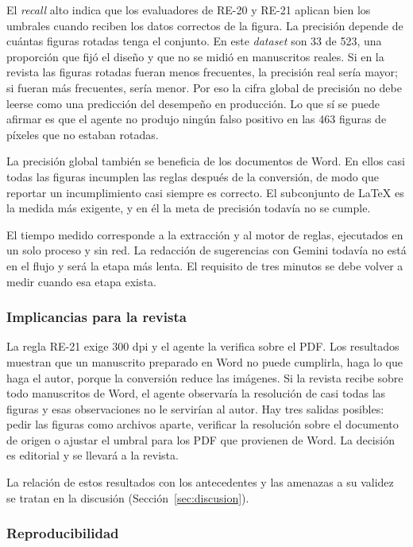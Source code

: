 El \emph{recall} alto indica que los evaluadores de RE-20 y RE-21 aplican bien los umbrales cuando reciben los datos correctos de la figura. La precisión depende de cuántas figuras rotadas tenga el conjunto. En este \emph{dataset} son 33 de 523, una proporción que fijó el diseño y que no se midió en manuscritos reales. Si en la revista las figuras rotadas fueran menos frecuentes, la precisión real sería mayor; si fueran más frecuentes, sería menor. Por eso la cifra global de precisión no debe leerse como una predicción del desempeño en producción. Lo que sí se puede afirmar es que el agente no produjo ningún falso positivo en las 463 figuras de píxeles que no estaban rotadas.

La precisión global también se beneficia de los documentos de Word. En ellos casi todas las figuras incumplen las reglas después de la conversión, de modo que reportar un incumplimiento casi siempre es correcto. El subconjunto de LaTeX es la medida más exigente, y en él la meta de precisión todavía no se cumple.

El tiempo medido corresponde a la extracción y al motor de reglas, ejecutados en un solo proceso y sin red. La redacción de sugerencias con Gemini todavía no está en el flujo y será la etapa más lenta. El requisito de tres minutos se debe volver a medir cuando esa etapa exista.

\subsubsection*{Implicancias para la revista}

La regla RE-21 exige 300 dpi y el agente la verifica sobre el PDF. Los resultados muestran que un manuscrito preparado en Word no puede cumplirla, haga lo que haga el autor, porque la conversión reduce las imágenes. Si la revista recibe sobre todo manuscritos de Word, el agente observaría la resolución de casi todas las figuras y esas observaciones no le servirían al autor. Hay tres salidas posibles: pedir las figuras como archivos aparte, verificar la resolución sobre el documento de origen o ajustar el umbral para los PDF que provienen de Word. La decisión es editorial y se llevará a la revista. 

La relación de estos resultados con los antecedentes y las amenazas a su validez se tratan en la discusión (Sección~\ref{sec:discusion}).

\subsubsection*{Reproducibilidad}

